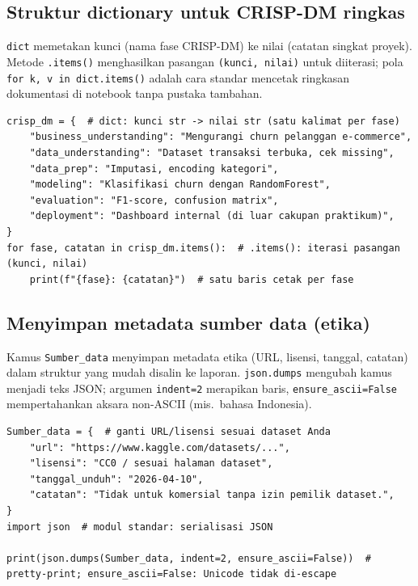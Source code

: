 \documentclass[../main.tex]{subfiles}
\begin{document}
\subsection{Struktur dictionary untuk CRISP-DM ringkas}

\MulaiPenjelasanKode \texttt{dict} memetakan kunci (nama fase CRISP-DM) ke nilai (catatan singkat proyek). Metode \texttt{.items()} menghasilkan pasangan \texttt{(kunci, nilai)} untuk diiterasi; pola \texttt{for k, v in dict.items()} adalah cara standar mencetak ringkasan dokumentasi di notebook tanpa pustaka tambahan. \SelesaiPenjelasanKode

\begin{lstlisting}[caption=Mapping fase CRISP-DM ke catatan proyek mini]
crisp_dm = {  # dict: kunci str -> nilai str (satu kalimat per fase)
    "business_understanding": "Mengurangi churn pelanggan e-commerce",
    "data_understanding": "Dataset transaksi terbuka, cek missing",
    "data_prep": "Imputasi, encoding kategori",
    "modeling": "Klasifikasi churn dengan RandomForest",
    "evaluation": "F1-score, confusion matrix",
    "deployment": "Dashboard internal (di luar cakupan praktikum)",
}
for fase, catatan in crisp_dm.items():  # .items(): iterasi pasangan (kunci, nilai)
    print(f"{fase}: {catatan}")  # satu baris cetak per fase
\end{lstlisting}

\subsection{Menyimpan metadata sumber data (etika)}

\MulaiPenjelasanKode Kamus \texttt{Sumber\_data} menyimpan metadata etika (URL, lisensi, tanggal, catatan) dalam struktur yang mudah disalin ke laporan. \texttt{json.dumps} mengubah kamus menjadi teks JSON; argumen \texttt{indent=2} merapikan baris, \texttt{ensure\_ascii=False} mempertahankan aksara non-ASCII (mis.\ bahasa Indonesia). \SelesaiPenjelasanKode

\begin{lstlisting}[caption=Blok dokumentasi sumber data di notebook]
Sumber_data = {  # ganti URL/lisensi sesuai dataset Anda
    "url": "https://www.kaggle.com/datasets/...",
    "lisensi": "CC0 / sesuai halaman dataset",
    "tanggal_unduh": "2026-04-10",
    "catatan": "Tidak untuk komersial tanpa izin pemilik dataset.",
}
import json  # modul standar: serialisasi JSON

print(json.dumps(Sumber_data, indent=2, ensure_ascii=False))  # pretty-print; ensure_ascii=False: Unicode tidak di-escape
\end{lstlisting}
\end{document}
